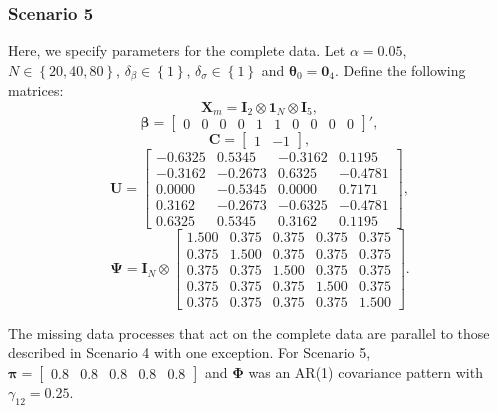 \documentclass[11pt]{article}
\begin{document}
\subsubsection{Scenario 5} 

Here, we specify parameters for the complete data. Let $\alpha=0.05$, $N\in\left\{20,40,80\right\}$, $\delta_{\beta}\in\left\{1\right\}$, $\delta_{\sigma}\in\left\{1\right\}$ and $\boldsymbol{\theta}_{0}=\boldsymbol{0}_{4}$. Define the following matrices:
\begin{equation}
\boldsymbol{X}_{m}=\boldsymbol{I}_{2}\otimes\boldsymbol{1}_{N}\otimes\boldsymbol{I}_{5},
\end{equation}
\begin{equation}
\boldsymbol{\beta}=
\begin{bmatrix}
0&0&0&0&1&1&0&0&0&0
\end{bmatrix}
',
\end{equation}
\begin{equation}
\boldsymbol{C}=
\begin{bmatrix}
1&-1
\end{bmatrix}
,
\end{equation}
\begin{equation}
\boldsymbol{U}=
\begin{bmatrix}
-0.6325&0.5345&-0.3162&0.1195\\
-0.3162&-0.2673&0.6325&-0.4781\\
0.0000&-0.5345&0.0000&0.7171\\
0.3162&-0.2673&-0.6325&-0.4781\\
0.6325&0.5345&0.3162&0.1195
\end{bmatrix}
,
\end{equation}
\begin{equation}
\boldsymbol{\Psi}=\boldsymbol{I}_{N}\otimes
\begin{bmatrix}
1.500&0.375&0.375&0.375&0.375\\
0.375&1.500&0.375&0.375&0.375\\
0.375&0.375&1.500&0.375&0.375\\
0.375&0.375&0.375&1.500&0.375\\
0.375&0.375&0.375&0.375&1.500
\end{bmatrix}
.
\end{equation}

The missing data processes that act on the complete data are parallel to those described in Scenario 4 with one exception. For Scenario 5, $\boldsymbol{\pi}=\begin{bmatrix}0.8&0.8&0.8&0.8&0.8\end{bmatrix}$ and $\boldsymbol{\Phi}$ was an AR(1) covariance pattern with $\gamma_{12}=0.25$.
\end{document}
